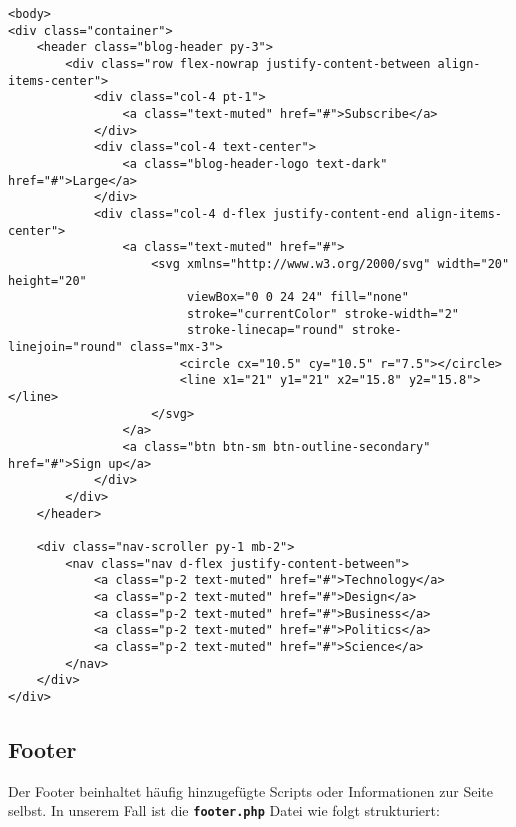 \documentclass[minted]{school}
\begin{document}
\newpage
\begin{verbatim}
<body>
<div class="container">
    <header class="blog-header py-3">
        <div class="row flex-nowrap justify-content-between align-items-center">
            <div class="col-4 pt-1">
                <a class="text-muted" href="#">Subscribe</a>
            </div>
            <div class="col-4 text-center">
                <a class="blog-header-logo text-dark" href="#">Large</a>
            </div>
            <div class="col-4 d-flex justify-content-end align-items-center">
                <a class="text-muted" href="#">
                    <svg xmlns="http://www.w3.org/2000/svg" width="20" height="20"
                         viewBox="0 0 24 24" fill="none"
                         stroke="currentColor" stroke-width="2"
                         stroke-linecap="round" stroke-linejoin="round" class="mx-3">
                        <circle cx="10.5" cy="10.5" r="7.5"></circle>
                        <line x1="21" y1="21" x2="15.8" y2="15.8"></line>
                    </svg>
                </a>
                <a class="btn btn-sm btn-outline-secondary" href="#">Sign up</a>
            </div>
        </div>
    </header>

    <div class="nav-scroller py-1 mb-2">
        <nav class="nav d-flex justify-content-between">
            <a class="p-2 text-muted" href="#">Technology</a>
            <a class="p-2 text-muted" href="#">Design</a>
            <a class="p-2 text-muted" href="#">Business</a>
            <a class="p-2 text-muted" href="#">Politics</a>
            <a class="p-2 text-muted" href="#">Science</a>
        </nav>
    </div>
</div>
\end{verbatim}

\newpage
\subsection{Footer}
Der Footer beinhaltet häufig hinzugefügte Scripts oder Informationen zur Seite selbst. In unserem Fall ist die \textbf{\texttt{footer.php}} Datei wie folgt strukturiert:
\end{document}
